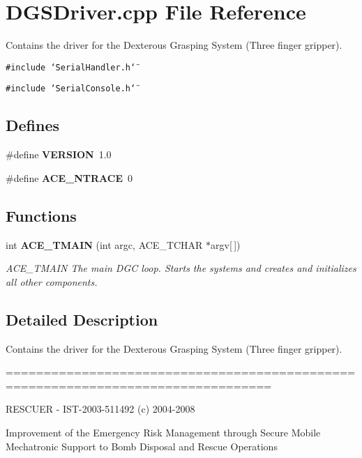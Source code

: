 \section{DGSDriver.cpp File Reference}
\label{DGSDriver_8cpp}
Contains the driver for the Dexterous Grasping System (Three finger gripper).  


{\tt \#include \char`\"{}Serial\-Handler.h\char`\"{}}\par
{\tt \#include \char`\"{}Serial\-Console.h\char`\"{}}\par
\subsection*{Defines}
\begin{CompactItemize}
\item 
\#define {\bf VERSION}\ 1.0
\item 
\#define {\bf ACE\_\-NTRACE}\ 0
\end{CompactItemize}
\subsection*{Functions}
\begin{CompactItemize}
\item 
int {\bf ACE\_\-TMAIN} (int argc, ACE\_\-TCHAR $\ast$argv[$\,$])
\begin{CompactList}\small\item\em ACE\_\-TMAIN The main DGC loop. Starts the systems and creates and initializes all other components. \item\end{CompactList}\end{CompactItemize}


\subsection{Detailed Description}
Contains the driver for the Dexterous Grasping System (Three finger gripper). 

=================================================================================

RESCUER - IST-2003-511492 (c) 2004-2008

Improvement of the Emergency Risk Management through Secure Mobile Mechatronic Support to Bomb Disposal and Rescue Operations


